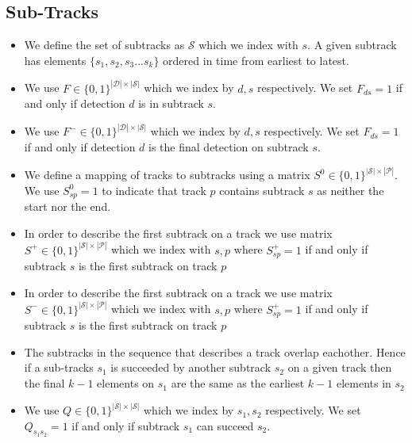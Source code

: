 \documentclass{article}
\begin{document}
 \subsection{Sub-Tracks }
   \begin{itemize}
\item 
We define the set of subtracks as $\mathcal{S}$ which we index with $s$.  A given subtrack has elements $\{s_1,s_2,s_3...s_k\}$ ordered in time from earliest to latest.  
\item
We use $F \in \{ 0,1\}^{|\mathcal{D}| \times |\mathcal{S}|}$ which we index by $d,s$ respectively.   We set $F_{ds}=1$ if and only if detection $d$ is in subtrack $s $.  
\item
We use $F^- \in \{ 0,1\}^{|\mathcal{D}| \times |\mathcal{S}|}$ which we index by $d,s$ respectively.   We set $F_{ds}=1$ if and only if detection $d$ is the final detection on subtrack $s$.  
\item 
We define a mapping of tracks to subtracks using a matrix $S^0 \in \{0,1 \}^{|\mathcal{S}|\times |\mathcal{P}|}$.  We use $S^0_{sp}=1$ to indicate that track $p$ contains subtrack $s$ as neither the start nor the end.  
\item 
In order to describe the first subtrack on a  track we use matrix $S^+ \in \{0,1 \}^{|\mathcal{S}|\times |\mathcal{P}|}$ which we index with $s,p$ where $S^+_{sp}=1$ if and only if subtrack $s$ is the first subtrack on track $p$
\item 
In order to describe the first subtrack on a  track we use matrix $S^- \in \{0,1 \}^{|\mathcal{S}|\times |\mathcal{P}|}$ which we index with  $s,p$ where $S^+_{sp}=1$ if and only if subtrack $s$ is the first subtrack on track $p$

\item 
The subtracks in the sequence that describes a track overlap eachother.  Hence if a sub-tracks $s_1$ is succeeded by another subtrack $s_2$ on a given track then the final $k-1$ elements on $s_1$ are the same as the earliest $k-1$ elements in $s_2$
\item
We use $Q \in \{ 0,1\}^{|\mathcal{S}| \times |\mathcal{S}|}$ which we index by $s_1,s_2$ respectively.   We set $Q_{s_1s_2}=1$ if and only if subtrack $s_1$ can succeed $s_2$.  
\end{itemize}
\end{document}
